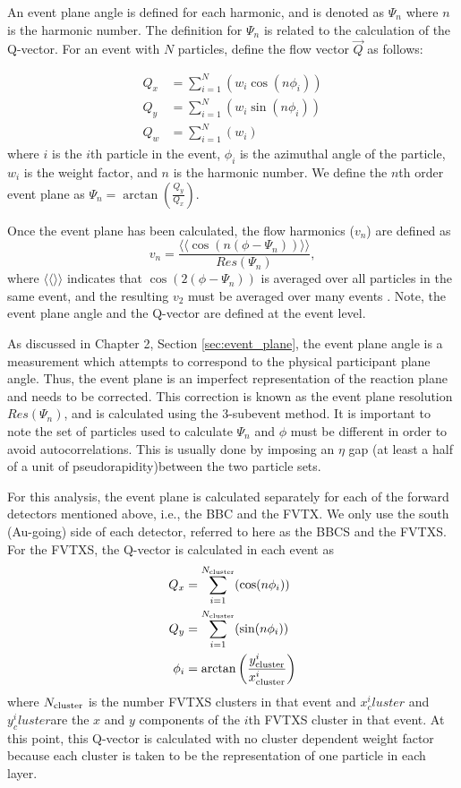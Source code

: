 An event plane angle is defined for each harmonic, and is denoted as $\Psi_n$ where $n$ is the harmonic number. The definition for $\Psi_n$ is related to the calculation of the Q-vector. For an event with $N$ particles, define the flow vector $\vec{Q}$ as follows:

\begin{align}
Q_x &= \sum_{i=1}^{N}( w_i \cos(n \phi_i)) \\
Q_y &= \sum_{i=1}^{N}( w_i \sin(n \phi_i)) \\
Q_w &= \sum_{i=1}^{N}( w_i )
\label{eqn:general_ep_math}
\end{align}
where $i$ is the $i$th particle in the event, $\phi_i$ is the azimuthal angle of the particle, $w_i$ is the weight factor, and $n$ is the harmonic number. We define the $n$th order event plane as
$\Psi_n = \arctan \left( \frac{Q_y}{Q_x} \right). $

Once the event plane has been calculated, the flow harmonics ($v_n$) are defined as
\begin{equation}
v_n = \frac{\langle \langle\cos(n(\phi - \Psi_n))\rangle \rangle}{Res(\Psi_n)},
\end{equation}
where $\langle \langle \rangle \rangle$ indicates that $\cos(2(\phi-\Psi_n))$ is averaged over all particles in the same event, and the resulting $v_2$ must be averaged over many events \cite{PhysRevC.58.1671}. Note, the event plane angle and the Q-vector are defined at the event level.
  
As discussed in Chapter 2, Section \ref{sec:event_plane}, the event plane angle is a measurement which attempts to correspond to the physical participant plane angle. Thus, the event plane is an imperfect representation of the reaction plane and needs to be corrected. This correction is known as the event plane resolution $Res(\Psi_n)$, and is calculated using the 3-subevent method. It is important to note the set of particles used to calculate $\Psi_n$ and $\phi$ must be different in order to avoid autocorrelations. This is usually done by imposing an $\eta$ gap (at least a half of a unit of pseudorapidity)between the two particle sets.

For this analysis, the event plane is calculated separately for each of the forward detectors mentioned above, i.e., the BBC and the FVTX. We only use the south (Au-going) side of each detector, referred to here as the BBCS and the FVTXS.
For the FVTXS, the Q-vector is calculated in each event as
\begin{align}
Q_x &= \sum^{N_{\rm cluster}}_{i=1}( \cos(n\phi_i)) \\
Q_y &= \sum^{N_{\rm cluster}}_{i=1}( \sin(n\phi_i)) \\
\phi_i &= \arctan\left(\frac{y^i_{\rm cluster}}{x^i_{\rm cluster}}\right)
\end{align}
where $N_{\rm cluster}$ is the number FVTXS clusters in that event and $x^i_cluster$ and $y^i_cluster$are the $x$ and $y$ components of the $i$th FVTXS cluster in that event. At this point, this Q-vector is calculated with no cluster dependent weight factor because each cluster is taken to be the representation of one particle in each layer.

